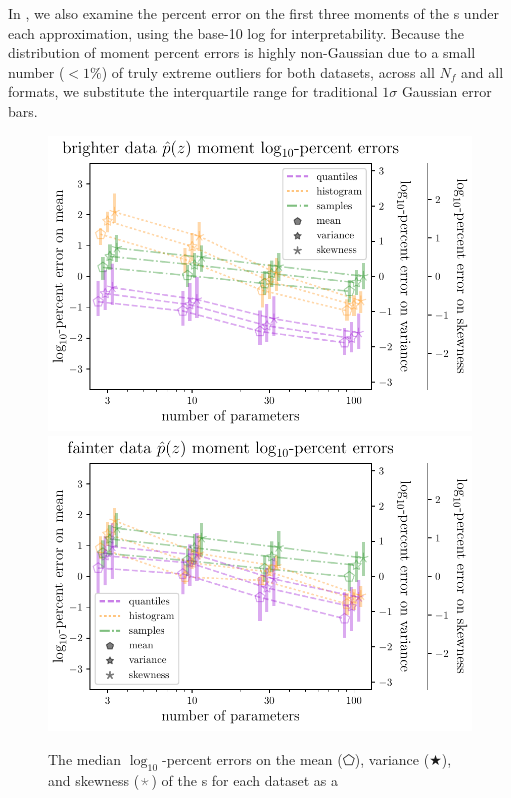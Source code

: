 In , we also examine the percent error on the 
first three moments of the \pz s under each approximation, using the base-10 
log for interpretability.
Because the distribution of moment percent errors is highly non-Gaussian due to 
a small number ($<1\%$) of truly extreme outliers for both datasets, across all 
$N_{f}$ and all formats, we substitute the interquartile range for traditional 
$1\sigma$ Gaussian error bars.
\begin{figure}
	\begin{center}
		\includegraphics[width=\columnwidth]{figures/qp/graham_pz_err.pdf}
		\includegraphics[width=\columnwidth]{figures/qp/schmidt_pz_err.pdf}
		\caption{
			The median $\log_{10}$-percent errors on the mean ($\pentagon$), variance 
			($\bigstar$), and skewness ($\APLstar$) of the \pz s for each dataset as a 
}
\end{center}
\end{figure}
